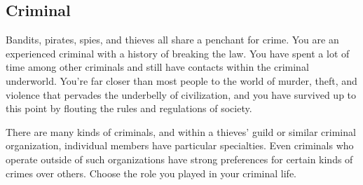 \thispagestyle{empty}

\subsection*{Criminal} \label{ssec::criminal}
    Bandits, pirates, spies, and thieves all share a penchant for crime.
    You are an experienced criminal with a history of breaking the law.
    You have spent a lot of time among other criminals and still have contacts within the criminal underworld.
    You're far closer than most people to the world of murder, theft, and violence that pervades the underbelly of civilization, and you have survived up to this point by flouting the rules and regulations of society.

    There are many kinds of criminals, and within a thieves' guild or similar criminal organization, individual members have particular specialties.
    Even criminals who operate outside of such organizations have strong preferences for certain kinds of crimes over others.
    Choose the role you played in your criminal life.

